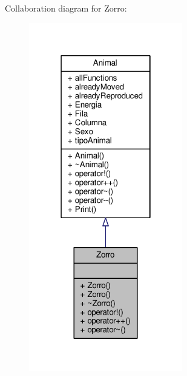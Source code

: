 Collaboration diagram for Zorro\+:\nopagebreak
\begin{figure}[H]
\begin{center}
\leavevmode
\includegraphics[width=190pt]{classZorro__coll__graph}
\end{center}
\end{figure}
